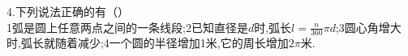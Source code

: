4.下列说法正确的有\hfill （\quad）\\

\textcircled{\small{1}}弧是圆上任意两点之间的一条线段;\textcircled{\small{2}}已知直径是$d$时,弧长$l=\frac{n}{360}\pi d$;\textcircled{\small{3}}圆心角增大时,弧长就随着减少;\textcircled{\small{4}}一个圆的半径增加1米,它的周长增加$2\pi$米.




